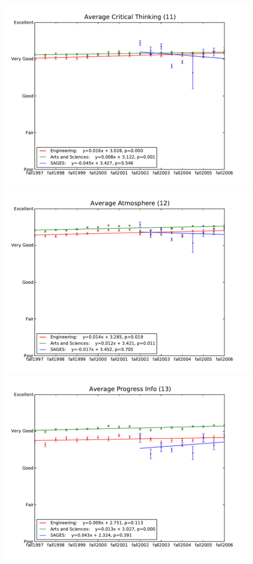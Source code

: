 \documentclass[12pt]{article}
\begin{document}
\begin{center}
    \includegraphics[width=5in]{figures/11_critthink_over_time.pdf} \\
    \includegraphics[width=5in]{figures/12_atmosphere_over_time.pdf} \\
    \includegraphics[width=5in]{figures/13_prog_info_over_time.pdf} \\

\end{center}
\end{document}
